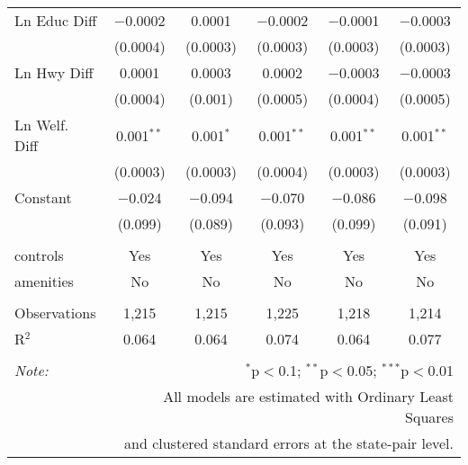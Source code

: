 \begin{table}[!htbp]
\begin{tabular}{@{\extracolsep{5pt}}lccccc}
  Ln Educ Diff & $-$0.0002 & 0.0001 & $-$0.0002 & $-$0.0001 & $-$0.0003 \\ 
  & (0.0004) & (0.0003) & (0.0003) & (0.0003) & (0.0003) \\ 
  Ln Hwy Diff & 0.0001 & 0.0003 & 0.0002 & $-$0.0003 & $-$0.0003 \\ 
  & (0.0004) & (0.001) & (0.0005) & (0.0004) & (0.0005) \\ 
  Ln Welf. Diff & 0.001$^{**}$ & 0.001$^{*}$ & 0.001$^{**}$ & 0.001$^{**}$ & 0.001$^{**}$ \\ 
  & (0.0003) & (0.0003) & (0.0004) & (0.0003) & (0.0003) \\ 
  Constant & $-$0.024 & $-$0.094 & $-$0.070 & $-$0.086 & $-$0.098 \\ 
  & (0.099) & (0.089) & (0.093) & (0.099) & (0.091) \\ 
 \hline \\[-1.8ex] 
controls & Yes & Yes & Yes & Yes & Yes \\ 
amenities & No & No & No & No & No \\ 
\hline \\[-1.8ex] 
Observations & 1,215 & 1,215 & 1,225 & 1,218 & 1,214 \\ 
R$^{2}$ & 0.064 & 0.064 & 0.074 & 0.064 & 0.077 \\ 
\hline 
\hline \\[-1.8ex] 
\textit{Note:}  & \multicolumn{5}{r}{$^{*}$p$<$0.1; $^{**}$p$<$0.05; $^{***}$p$<$0.01} \\ 
 & \multicolumn{5}{r}{All models are estimated with Ordinary Least Squares} \\ 
 & \multicolumn{5}{r}{and clustered standard errors at the state-pair level.} \\ 
\end{tabular} 
\end{table} 

